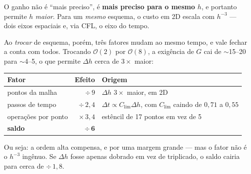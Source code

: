 \documentclass[11pt,a4paper,oneside]{report}
\begin{document}
\begin{atencao}
O ganho n\~ao \'e ``mais preciso'', \'e \textbf{mais preciso para o mesmo
$h$}, e portanto permite $h$ \emph{maior}. Para um \emph{mesmo} esquema, o
custo em 2D escala com $h^{-3}$ --- dois eixos espaciais e, via CFL, o eixo do
tempo.

Ao \emph{trocar} de esquema, por\'em, tr\^es fatores mudam ao mesmo tempo, e
vale fechar a conta com todos. Trocando $\mathcal{O}(2)$ por
$\mathcal{O}(8)$, a exig\^encia de $G$ cai de $\sim$15--20 para $\sim$4--5,
o que permite $\Delta h$ cerca de $3\times$ maior:

\begin{center}
\begin{tabular}{@{}lrl@{}}
\toprule
\textbf{Fator} & \textbf{Efeito} & \textbf{Origem} \\
\midrule
pontos da malha & $\div\,9$ & $\Delta h$ $3\times$ maior, em 2D \\
passos de tempo & $\div\,2{,}4$ & $\Delta t \propto C_{\lim}\Delta h$, com
  $C_{\lim}$ caindo de $0{,}71$ a $0{,}55$ \\
opera\c{c}\~oes por ponto & $\times\,3{,}4$ & est\^encil de 17 pontos em vez
  de 5 \\
\midrule
\textbf{saldo} & $\mathbf{\div\,6}$ & \\
\bottomrule
\end{tabular}
\end{center}

Ou seja: a ordem alta compensa, e por uma margem grande --- mas o fator n\~ao
\'e o $h^{-3}$ ing\^enuo. Se $\Delta h$ fosse apenas dobrado em vez de
triplicado, o saldo cairia para cerca de $\div\,1{,}8$.
\end{atencao}
\end{document}
